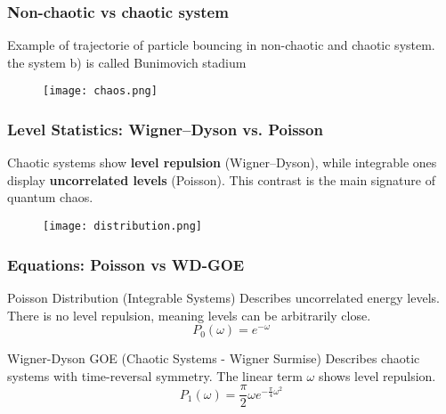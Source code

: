 
\begin{frame}

\frametitle{Non-chaotic vs chaotic system}
    
    \begin{block}{}
    Example of trajectorie of particle bouncing in non-chaotic and chaotic system. the system b) is called Bunimovich stadium
    \end{block}

\begin{figure}
    \centering\texttt{[image: chaos.png]}
\end{figure}

\end{frame}

\begin{frame}[plain]
    \frametitle{Level Statistics: Wigner–Dyson vs. Poisson}
    
    \begin{block}{}
    Chaotic systems show \textbf{level repulsion} (Wigner–Dyson),  
    while integrable ones display \textbf{uncorrelated levels} (Poisson).  
    This contrast is the main signature of quantum chaos.
    \end{block}
    
    \begin{figure}
        \texttt{[image: distribution.png]}
    \end{figure}
\end{frame}

\begin{frame}

  \frametitle{Equations: Poisson vs WD-GOE}
  
  \begin{block}{Poisson Distribution (Integrable Systems)}
  Describes uncorrelated energy levels. There is no level repulsion, meaning levels can be arbitrarily close.
  \[
  P_0(\omega) = e^{-\omega}
  \]
  \end{block}
  
  \begin{block}{Wigner-Dyson GOE (Chaotic Systems - Wigner Surmise)}
  Describes chaotic systems with time-reversal symmetry. The linear term $\omega$ shows level repulsion.
  \[
  P_1(\omega) = \frac{\pi}{2}\omega e^{-\frac{\pi}{4}\omega^2}
  \]
  \end{block}

\end{frame}

